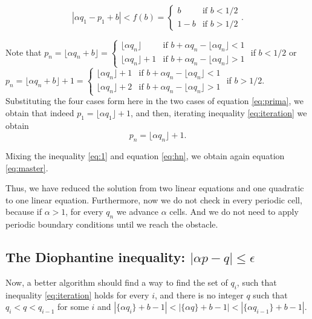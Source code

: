 \documentclass[pre,amsmath,amssymb, twocolumn, showpacs]{revtex4-1}
\begin{document}
\begin{equation}
|\alpha q_1 -p_1 + b|< f(b) = \begin{cases} b &\mbox{if } b < 1/2 \\ 
1-b & \mbox{if } b > 1/2 \end{cases} .
\label{eq:prima}
\end{equation}

Note that $p_n= \lfloor \alpha q_n +b  \rfloor= \begin{cases} \lfloor \alpha q_n  \rfloor  &\mbox{if } b+\alpha q_n-\lfloor \alpha q_n  \rfloor < 1 \\ 
 \lfloor \alpha q_n  \rfloor+1  &\mbox{if } b+\alpha q_n-\lfloor \alpha q_n  \rfloor > 1 \end{cases}$ if $b<1/2$ or $p_n= \lfloor \alpha q_n +b  \rfloor+1= \begin{cases} \lfloor \alpha q_n  \rfloor+1  &\mbox{if } b+\alpha q_n-\lfloor \alpha q_n  \rfloor < 1 \\ 
 \lfloor \alpha q_n  \rfloor+2  &\mbox{if } b+\alpha q_n-\lfloor \alpha q_n  \rfloor > 1 \end{cases}$ if $b>1/2$. Substituting the four cases form here in the two cases of equation \ref{eq:prima}, we obtain that indeed $p_1= \lfloor \alpha q_1  \rfloor+1$, and then,  iterating  inequality \ref{eq:iteration} we obtain 
\begin{equation}
 p_n= \lfloor \alpha q_n  \rfloor+1.
\label{eq:hn}
\end{equation}
 
Mixing the inequality \eqref{eq:1} and equation \eqref{eq:hn}, we obtain again equation \eqref{eq:master}. 

Thus, we have reduced the solution from two linear equations and one quadratic to one linear equation. Furthermore, now we do not check in every periodic cell, because if $\alpha >1$, for every $q_n$ we advance $\alpha$ cells. And we do not need to apply periodic boundary conditions until we reach the obstacle. 

\subsection{The Diophantine inequality: $|\alpha p - q|\leq \epsilon$}

Now, a better algorithm should find a way to find the set of $q_i$, such that inequality \eqref{eq:iteration} holds for every $i$, and there is no integer $q$  such that $q_i<q<q_{i-1}$ for some $i$ and
$|\{ \alpha  q_i \}+b -1|<|\{ \alpha  q \}+b -1| <|\{ \alpha  q_{i-1} \}+b -1|$. 
\end{document}

